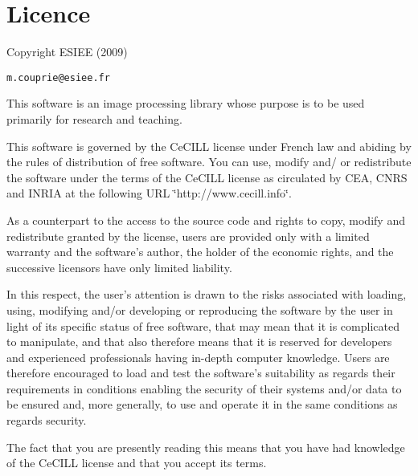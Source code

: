\section{Licence}\label{index_warning}
Copyright ESIEE (2009)

{\tt m.couprie@esiee.fr}

This software is an image processing library whose purpose is to be used primarily for research and teaching.

This software is governed by the CeCILL license under French law and abiding by the rules of distribution of free software. You can use, modify and/ or redistribute the software under the terms of the CeCILL license as circulated by CEA, CNRS and INRIA at the following URL \char`\"{}http://www.cecill.info\char`\"{}.

As a counterpart to the access to the source code and rights to copy, modify and redistribute granted by the license, users are provided only with a limited warranty and the software's author, the holder of the economic rights, and the successive licensors have only limited liability.

In this respect, the user's attention is drawn to the risks associated with loading, using, modifying and/or developing or reproducing the software by the user in light of its specific status of free software, that may mean that it is complicated to manipulate, and that also therefore means that it is reserved for developers and experienced professionals having in-depth computer knowledge. Users are therefore encouraged to load and test the software's suitability as regards their requirements in conditions enabling the security of their systems and/or data to be ensured and, more generally, to use and operate it in the same conditions as regards security.

The fact that you are presently reading this means that you have had knowledge of the CeCILL license and that you accept its terms. 